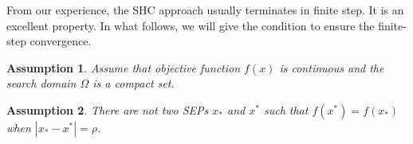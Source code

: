 \documentclass[preprint,12pt]{elsarticle}
\newtheorem{assume}{Assumption}
\newtheorem{theorem}{Theorem}
\begin{document}

From our experience, the SHC approach usually terminates in 
finite step. It is an excellent property. In what follows, we will
give the condition to ensure the finite-step convergence.

\begin{assume}
	Assume that objective function $f(x)$ is continuous and the
	search domain $\Omega$ is a compact set. 
	\label{assume:fx}
\end{assume}

\begin{assume}
	There are not two SEPs $x_*$ and $x^*$ such that
	$f(x^*)=f(x_*)$ when $|x_*-x^*|=\rho$.
	\label{assume:sep}
\end{assume}
\end{document}
